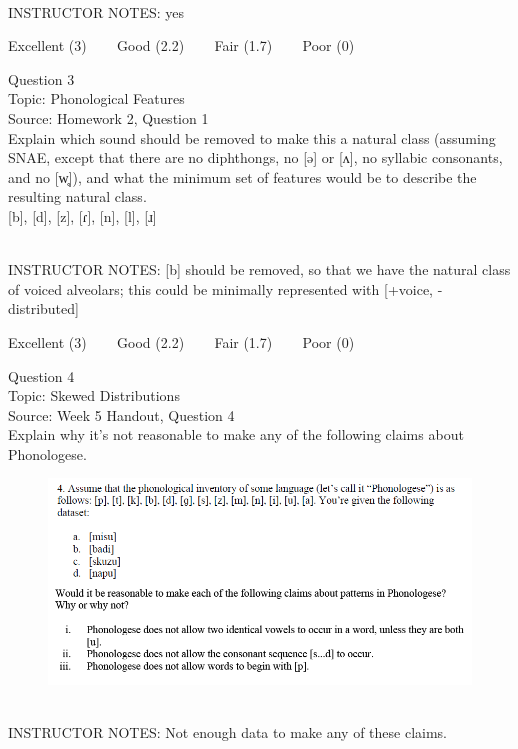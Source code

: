 \documentclass[12pt]{article}
\begin{document}
~\\
INSTRUCTOR NOTES: yes


\vfill
Excellent (3) ~~~ Good (2.2) ~~~ Fair (1.7) ~~~ Poor (0)
\newpage

{\large Question 3}\\

Topic: Phonological Features\\
Source: Homework 2, Question 1\\

Explain which sound should be removed to make this a natural class (assuming SNAE, except that there are no diphthongs, no [ə] or [ʌ], no syllabic consonants, and no [w̥]), and what the minimum set of features would be to describe the resulting natural class.\\

{[b]}, {[d]}, {[z]}, {[ɾ]}, {[n]}, {[l]}, {[ɹ]}


~\\
INSTRUCTOR NOTES: [b] should be removed, so that we have the natural class of voiced alveolars; this could be minimally represented with [+voice, -distributed]


\vfill
Excellent (3) ~~~ Good (2.2) ~~~ Fair (1.7) ~~~ Poor (0)
\newpage

{\large Question 4}\\

Topic: Skewed Distributions\\
Source: Week 5 Handout, Question 4\\

Explain why it's not reasonable to make any of the following claims about Phonologese.\\

\begin{figure}[H]
\includegraphics{../images/Phonologese.png}
\end{figure}

~\\
INSTRUCTOR NOTES: Not enough data to make any of these claims.
\end{document}

